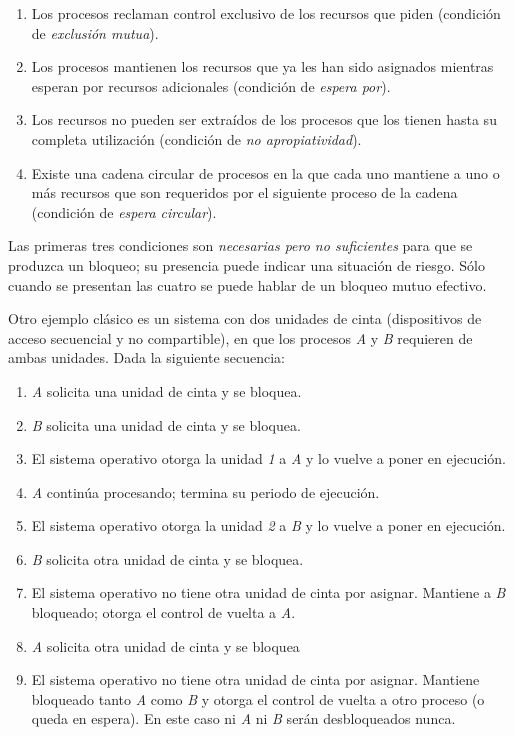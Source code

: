 \documentclass[11pt,fleqn]{book} %
\begin{document}
\begin{enumerate}
\item Los procesos reclaman control exclusivo de los recursos que piden
   (condición de \emph{exclusión mutua}).
\item Los procesos mantienen los recursos que ya les han sido asignados
   mientras esperan por recursos adicionales (condición de \emph{espera    por}).
\item Los recursos no pueden ser extraídos de los procesos que los tienen
   hasta su completa utilización (condición de \emph{no apropiatividad}).
\item Existe una cadena circular de procesos en la que cada uno mantiene a
   uno o más recursos que son requeridos por el siguiente proceso de la
   cadena (condición de \emph{espera circular}).
\end{enumerate}

Las primeras tres condiciones son \emph{necesarias pero no suficientes}
para que se produzca un bloqueo; su presencia puede indicar una
situación de riesgo. Sólo cuando se presentan las cuatro se puede
hablar de un bloqueo mutuo efectivo.

Otro ejemplo clásico es un sistema con dos unidades de cinta
(dispositivos de acceso secuencial y no compartible), en que los
procesos \emph{A} y \emph{B} requieren de ambas unidades. Dada la siguiente
secuencia:

\begin{enumerate}
\item \emph{A} solicita una unidad de cinta y se bloquea.
\item \emph{B} solicita una unidad de cinta y se bloquea.
\item El sistema operativo otorga la unidad \emph{1} a \emph{A} y lo vuelve a poner
   en ejecución.
\item \emph{A} continúa procesando; termina su periodo de ejecución.
\item El sistema operativo otorga la unidad \emph{2} a \emph{B} y lo vuelve a poner
   en ejecución.
\item \emph{B} solicita otra unidad de cinta y se bloquea.
\item El sistema operativo no tiene otra unidad de cinta por
   asignar. Mantiene a \emph{B} bloqueado; otorga el control de vuelta a
   \emph{A}.
\item \emph{A} solicita otra unidad de cinta y se bloquea
\item El sistema operativo no tiene otra unidad de cinta por
   asignar. Mantiene bloqueado tanto \emph{A} como \emph{B} y otorga el control de vuelta a
   otro proceso (o queda en espera). En este caso ni \emph{A} ni \emph{B} serán desbloqueados
   nunca.
\end{enumerate}
\end{document}
